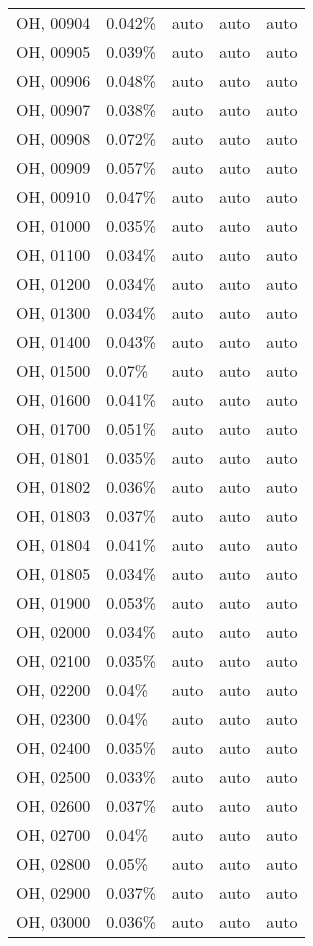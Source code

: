 \begin{longtable}[]{@{}lllll@{}}
OH, 00904 & 0.042\% & auto & auto & auto \\
OH, 00905 & 0.039\% & auto & auto & auto \\
OH, 00906 & 0.048\% & auto & auto & auto \\
OH, 00907 & 0.038\% & auto & auto & auto \\
OH, 00908 & 0.072\% & auto & auto & auto \\
OH, 00909 & 0.057\% & auto & auto & auto \\
OH, 00910 & 0.047\% & auto & auto & auto \\
OH, 01000 & 0.035\% & auto & auto & auto \\
OH, 01100 & 0.034\% & auto & auto & auto \\
OH, 01200 & 0.034\% & auto & auto & auto \\
OH, 01300 & 0.034\% & auto & auto & auto \\
OH, 01400 & 0.043\% & auto & auto & auto \\
OH, 01500 & 0.07\% & auto & auto & auto \\
OH, 01600 & 0.041\% & auto & auto & auto \\
OH, 01700 & 0.051\% & auto & auto & auto \\
OH, 01801 & 0.035\% & auto & auto & auto \\
OH, 01802 & 0.036\% & auto & auto & auto \\
OH, 01803 & 0.037\% & auto & auto & auto \\
OH, 01804 & 0.041\% & auto & auto & auto \\
OH, 01805 & 0.034\% & auto & auto & auto \\
OH, 01900 & 0.053\% & auto & auto & auto \\
OH, 02000 & 0.034\% & auto & auto & auto \\
OH, 02100 & 0.035\% & auto & auto & auto \\
OH, 02200 & 0.04\% & auto & auto & auto \\
OH, 02300 & 0.04\% & auto & auto & auto \\
OH, 02400 & 0.035\% & auto & auto & auto \\
OH, 02500 & 0.033\% & auto & auto & auto \\
OH, 02600 & 0.037\% & auto & auto & auto \\
OH, 02700 & 0.04\% & auto & auto & auto \\
OH, 02800 & 0.05\% & auto & auto & auto \\
OH, 02900 & 0.037\% & auto & auto & auto \\
OH, 03000 & 0.036\% & auto & auto & auto \\

\end{longtable}
